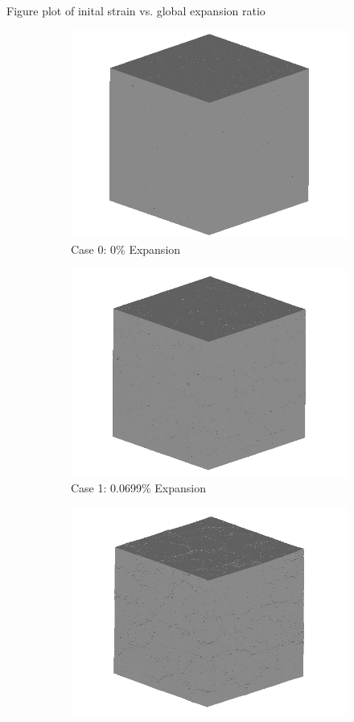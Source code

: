 Figure plot of inital strain vs. global expansion ratio

\begin{figure}[!h]
\centering

    \begin{subfigure}{.5\textwidth}
      \centering
      \includegraphics[width=.8\linewidth]{Files/exp_3D/ASR/A30Undamaged.png}
    \caption{Case 0: 0\% Expansion}
    \end{subfigure}%
    \begin{subfigure}{.5\textwidth}
      \centering
      \includegraphics[width=.8\linewidth]{Files/exp_3D/ASR/A30P75_1_3d.png}
    \caption{Case 1: 0.0699\% Expansion}
    \end{subfigure}
    \begin{subfigure}{.5\textwidth}
      \centering
      \includegraphics[width=.8\linewidth]{Files/exp_3D/ASR/A30P75_2_3d.png}

\end{subfigure}
\end{figure}
